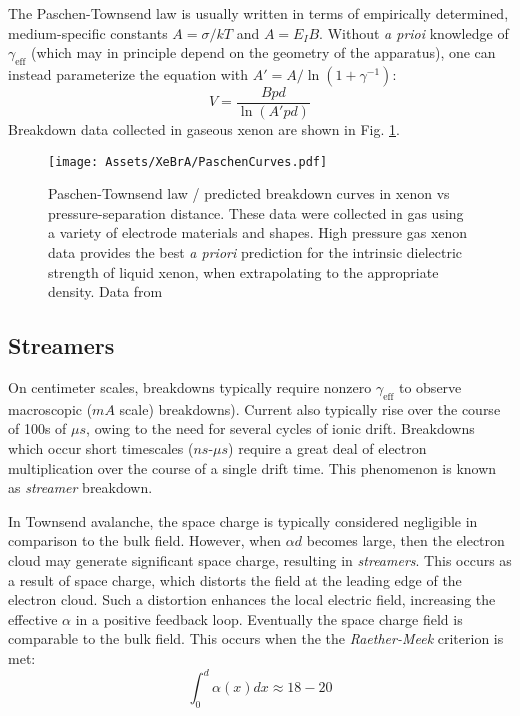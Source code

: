 The Paschen-Townsend law is usually written in terms of empirically determined, medium-specific constants $A =  \sigma / kT$ and $A=E_I B$.
Without \textit{a prioi} knowledge of $\gamma_{\text{eff}}$ (which may in principle depend on the geometry of the apparatus), one can instead parameterize the equation with $A' = A/ \ln (1 + \gamma^{-1})$:
\begin{equation}
    V = \frac{Bpd}{\ln( A' pd)}
    \label{eq:paschentownsend}
\end{equation}
\noindent
Breakdown data collected in gaseous xenon are shown in Fig. \ref{fig:xe_paschen_curves}.

\begin{figure} 
    \centering
    \texttt{[image: Assets/XeBrA/PaschenCurves.pdf]}
    \caption[Paschen-Townsend law / predicted breakdown curves in xenon vs pressure-separation distance.]%
    {Paschen-Townsend law / predicted breakdown curves in xenon vs pressure-separation distance.
    These data were collected in gas using a variety of electrode materials and shapes. 
    High pressure gas xenon data provides the best \textit{a priori} prediction for the intrinsic dielectric strength of liquid xenon, when extrapolating to the appropriate density.
    Data from \cite{ bhattacharya_measurement_1976, kruithof_townsends_1940, berzak_paschens_2006, massarczyk_paschens_2017, norman_dielectric_2021, postel_parametric_2001-1}
    }
    \label{fig:xe_paschen_curves}
\end{figure}
\subsection{Streamers}
On centimeter scales, breakdowns typically require nonzero $\gamma_{\text{eff}}$ to observe macroscopic ($mA$ scale) breakdowns).
Current also typically rise over the course of 100s of $\mu s$, owing to the need for several cycles of ionic drift.
Breakdowns which occur short timescales ($ns$-$\mu s$) require a great deal of electron multiplication over the course of a single drift time.
This phenomenon is known as \textit{streamer} breakdown.

In Townsend avalanche, the space charge is typically considered negligible in comparison to the bulk field.
However, when $\alpha d$ becomes large, then the electron cloud may generate significant space charge, resulting in \textit{streamers}. 
This occurs as a result of space charge, which distorts the field at the leading edge of the electron cloud.
Such a distortion enhances the local electric field, increasing the effective $\alpha$ in a positive feedback loop.
Eventually the space charge field is comparable to the bulk field.
This occurs when the the \textit{Raether-Meek} criterion\cite{meek_theory_1940} is met: 
\begin{equation}
    \int_0^d \alpha(x) dx \approx 18-20
\end{equation}
